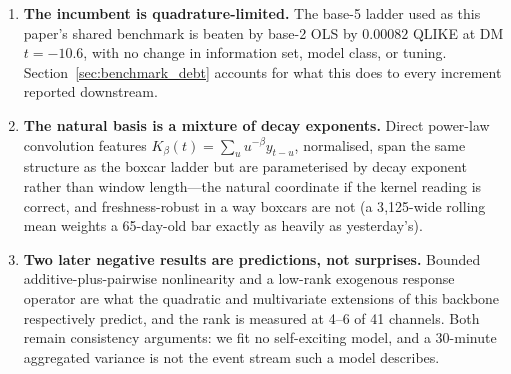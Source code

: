 \begin{enumerate}
  \item \textbf{The incumbent is quadrature-limited.} The base-5 ladder used
    as this paper's shared benchmark is beaten by base-2 OLS by $0.00082$
    QLIKE at DM $t = -10.6$, with no change in information set, model class, or
    tuning. Section~\ref{sec:benchmark_debt} accounts for what this does to
    every increment reported downstream.
  \item \textbf{The natural basis is a mixture of decay exponents.} Direct
    power-law convolution features $K_\beta(t) = \sum_u u^{-\beta} y_{t-u}$,
    normalised, span the same structure as the boxcar ladder but are
    parameterised by decay exponent rather than window length---the natural
    coordinate if the kernel reading is correct, and freshness-robust in a way
    boxcars are not (a 3{,}125-wide rolling mean weights a 65-day-old bar
    exactly as heavily as yesterday's).
  \item \textbf{Two later negative results are predictions, not surprises.}
    Bounded additive-plus-pairwise nonlinearity and a low-rank exogenous
    response operator are what the quadratic and multivariate extensions of
    this backbone respectively predict, and the rank is measured at 4--6 of 41
    channels. Both remain consistency arguments: we fit no self-exciting model,
    and a 30-minute aggregated variance is not the event stream such a model
    describes.
\end{enumerate}
